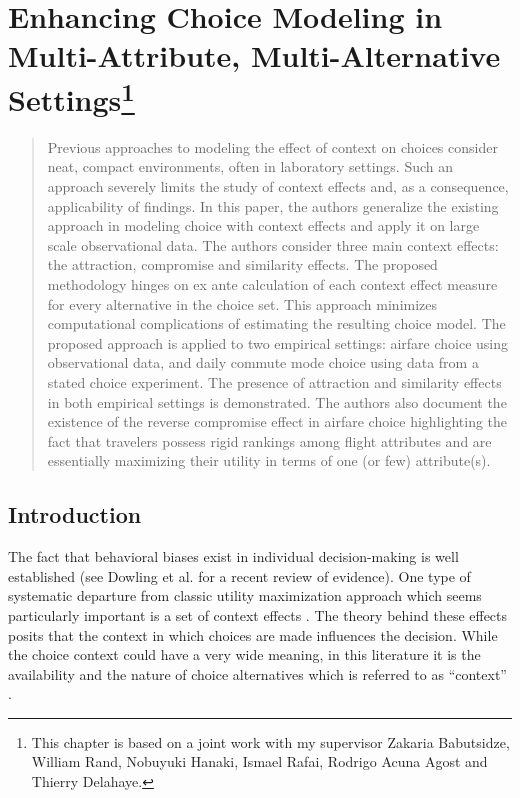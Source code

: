 \documentclass[a4paper,12pt]{article}
\newcommand{\citeyearonly}[1]{\citeyearpar{#1}}
\begin{document}
\section{Enhancing Choice Modeling in Multi-Attribute, Multi-Alternative Settings\footnote{This chapter is based on a joint work with my supervisor Zakaria Babutsidze, William Rand, Nobuyuki Hanaki, Ismael Rafai, Rodrigo Acuna Agost and Thierry Delahaye.}}\label{chapter:jmrPaper} 


\begin{abstract}

    Previous approaches to modeling the effect of context on choices consider neat, compact environments, often in laboratory settings. Such an approach severely limits the study of context effects and, as a consequence, applicability of findings. In this paper, the authors generalize the existing approach in modeling choice with context effects and apply it on large scale observational data. The authors consider three main context effects: the attraction, compromise and similarity effects. The proposed methodology hinges on ex ante calculation of each context effect measure for every alternative in the choice set. This approach minimizes computational complications of estimating the resulting choice model. The proposed approach is applied to two empirical settings: airfare choice using observational data, and daily commute mode choice using data from a stated choice experiment. The presence of attraction and similarity effects in both empirical settings is demonstrated. The authors also document the existence of the reverse compromise effect in airfare choice highlighting the fact that travelers possess rigid rankings among flight attributes and are essentially maximizing their utility in terms of one (or few) attribute(s).
    
\end{abstract}

\subsection{Introduction}

The fact that behavioral biases exist in individual decision-making is well established (see Dowling et al. \citeyearonly{dowlingEtAl20} for a recent review of evidence). One type of systematic departure from classic utility maximization approach which seems particularly important is a set of context effects \citep{truebloodEtAl13, kocherEtAl19}. The theory behind these effects posits that the context in which choices are made influences the decision. While the choice context could have a very wide meaning, in this literature it is the availability and the nature of choice alternatives which is referred to as ``context'' \citep{tversky1972elimination, huberEtAl82, simonson89}.
\end{document}
